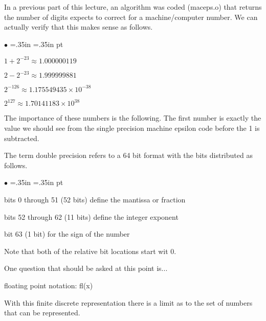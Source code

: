 \documentclass[10pt,fleqn]{article}
\begin{document}
In a previous part of this lecture, an algorithm was coded (maceps.o) that
returns the number of digits expects to correct for a machine/computer number.
We can actually verify that this makes sense as follows.
\begin{list}{$\bullet$}{ \parsep=0pt \listparindent=0pt
\topsep=0pt \rightmargin=.35in \leftmargin=.35in  pt
\itemsep=2pt}
  \item $1 + 2^{-23} \approx 1.000000119$
  \item $2 - 2^{-23} \approx 1.999999881$
  \item $2^{-126} \approx 1.175549435 \times 10^{-38}$
  \item $2^{127} \approx 1.70141183 \times 10^{38}$
\end{list}
The importance of these numbers is the following. The first number is exactly
the value we should see from the single precision machine epsilon code before
the 1 is subtracted.

The term double precision refers to a 64 bit format with the bits distributed as
follows.
\begin{list}{$\bullet$}{ \parsep=0pt \listparindent=0pt
\topsep=0pt \rightmargin=.35in \leftmargin=.35in  pt
\itemsep=2pt}
  \item bits 0 through 51 (52 bits) define the mantissa or fraction
  \item bits 52 through 62 (11 bits) define the integer exponent
  \item bit 63 (1 bit) for the sign of the number
\end{list}
Note that both of the relative bit locations start wit $0$.

One question that should be asked at this point is...







floating point notation:   fl(x)





With this finite discrete representation there is a limit as to the set of
numbers that can be represented.
\end{document}
